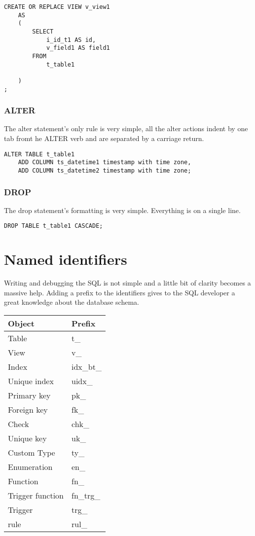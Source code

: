 \begin{lstlisting}[style=pgsql]
CREATE OR REPLACE VIEW v_view1
	AS
	(
		SELECT
			i_id_t1 AS id,
			v_field1 AS field1
		FROM
			t_table1
		
	)
;

\end{lstlisting}


\subsubsection{ALTER}
The alter statement's only rule is very simple, all the alter actions indent by one tab fromt he ALTER verb and are 
separated by a carriage return.

\begin{lstlisting}[style=pgsql]
ALTER TABLE t_table1
	ADD COLUMN ts_datetime1 timestamp with time zone,
	ADD COLUMN ts_datetime2 timestamp with time zone;
\end{lstlisting}


\subsubsection{DROP}
The drop statement's formatting is very simple. Everything is on a single line.

\begin{lstlisting}[style=pgsql]
DROP TABLE t_table1 CASCADE;
\end{lstlisting}


\section{Named identifiers}
Writing and debugging the SQL is not simple and a little bit of clarity becomes a massive help. Adding a prefix 
to the identifiers gives to the SQL developer a great knowledge about the database schema.\newline 


\begin{table}[H]
\begin{tabular}{ll}
 \textbf{Object} & \textbf{Prefix}  \\
 \hline
 Table & t\_ \\
 View & v\_ \\
Index & idx\_bt\_ \\
Unique index & uidx\_ \\
Primary key & pk\_ \\
Foreign key & fk\_ \\
Check & chk\_ \\
Unique key & uk\_ \\
Custom Type & ty\_ \\
Enumeration & en\_ \\
Function & fn\_ \\
Trigger function & fn\_trg\_ \\
Trigger & trg\_ \\
rule & rul\_ \\

\end{tabular}
\end{table}

